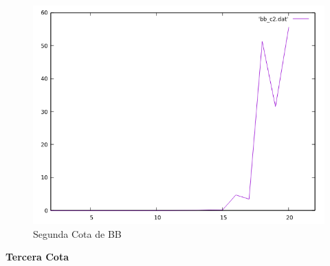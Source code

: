 \documentclass[a4paper,12pt,twoside]{article} %
\begin{document}
\begin{figure}[h]
  \begin{center}
  
  	\includegraphics[scale=0.7]{IMAGENES/bb_c2.png}
  	\caption{Segunda Cota de BB}
  	
  \end{center}
\end{figure}
\newpage

\textbf{Tercera Cota}
\end{document}
